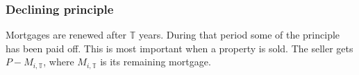 {%



\subsubsection{Declining principle}\label{sec:declining-principle}

Mortgages are renewed after $\mathbb{T}$ years. During that period some of the principle has been paid off. This is most important when a property is sold. The seller gets $P-M_{i,\mathbb{T}}$, where  $M_{i,\mathbb{T}}$ is its remaining mortgage.




}
